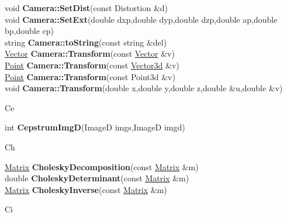\documentclass[10pt,titlepage]{article}
\def\functionlistentry#1#2#3#4#5#6{\noindent #1 {\bf #2}(#3) \dotfill #6\\}
\def\letterref#1{}
\def\letterlabel#1{\vspace{0.5cm}\centerline{\Large #1}}
\def\letterlabelend#1{}
\begin{document}
{{\functionlistentry{void}{Camera::SetDist}{const Distortion \&d}{781}{cameraModel}{}
\functionlistentry{void}{Camera::SetExt}{double dxp,double dyp,double dzp,double ap,double bp,double cp}{776}{cameraModel}{}
\functionlistentry{string}{Camera::toString}{const string \&del}{791}{cameraModel}{}
\functionlistentry{\hyperlink{Vector}{Vector}}{Camera::Transform}{const \hyperlink{Vector}{Vector} \&v}{784}{cameraModel}{}
\functionlistentry{\hyperlink{Point}{Point}}{Camera::Transform}{const \hyperlink{Vector3d}{Vector3d} \&v}{785}{cameraModel}{}
\functionlistentry{\hyperlink{Point}{Point}}{Camera::Transform}{const Point3d \&v}{786}{cameraModel}{}
\functionlistentry{void}{Camera::Transform}{double x,double y,double z,double \&u,double \&v}{787}{cameraModel}{}

\letterlabel{Ce}
\letterref{A}
\letterref{B}
\letterref{C}
\letterref{D}
\letterref{E}
\letterref{F}
\letterref{G}
\letterref{H}
\letterref{I}
\letterref{K}
\letterref{L}
\letterref{M}
\letterref{N}
\letterref{O}
\letterref{P}
\letterref{Q}
\letterref{R}
\letterref{S}
\letterref{T}
\letterref{U}
\letterref{V}
\letterref{W}
\letterref{X}
\letterref{Y}
\letterref{Z}

\letterref{Ca}
\letterref{Ce}
\letterref{Ch}
\letterref{Ci}
\letterref{Cl}
\letterref{Co}
\letterref{Cr}
\letterref{Cu}
\letterlabelend{Ce}
\functionlistentry{int}{CepstrumImgD}{ImageD imgs,ImageD imgd}{1210}{signalTrafo}{}

\letterlabel{Ch}
\letterref{A}
\letterref{B}
\letterref{C}
\letterref{D}
\letterref{E}
\letterref{F}
\letterref{G}
\letterref{H}
\letterref{I}
\letterref{K}
\letterref{L}
\letterref{M}
\letterref{N}
\letterref{O}
\letterref{P}
\letterref{Q}
\letterref{R}
\letterref{S}
\letterref{T}
\letterref{U}
\letterref{V}
\letterref{W}
\letterref{X}
\letterref{Y}
\letterref{Z}

\letterref{Ca}
\letterref{Ce}
\letterref{Ch}
\letterref{Ci}
\letterref{Cl}
\letterref{Co}
\letterref{Cr}
\letterref{Cu}
\letterlabelend{Ch}
\functionlistentry{\hyperlink{Matrix}{Matrix}}{CholeskyDecomposition}{const \hyperlink{Matrix}{Matrix} \&m}{1116}{matrixAlgebra}{}
\functionlistentry{double}{CholeskyDeterminant}{const \hyperlink{Matrix}{Matrix} \&m}{1119}{matrixAlgebra}{}
\functionlistentry{\hyperlink{Matrix}{Matrix}}{CholeskyInverse}{const \hyperlink{Matrix}{Matrix} \&m}{1115}{matrixAlgebra}{}

\letterlabel{Ci}
\letterref{A}
\letterref{B}
\letterref{C}
\letterref{D}
\letterref{E}
\letterref{F}
\letterref{G}
\letterref{H}
\letterref{I}
\letterref{K}
\letterref{L}
\letterref{M}
\letterref{N}
\letterref{O}
\letterref{P}
\letterref{Q}
\letterref{R}
\letterref{S}
\letterref{T}
\letterref{U}
\letterref{V}
\letterref{W}
\letterref{X}
\letterref{Y}
\letterref{Z}

}}
\end{document}
